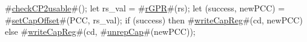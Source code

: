 #\hyperref[sailMIPSzcheckCP2usable]{checkCP2usable}#();
let rs_val = #\hyperref[sailMIPSzrGPR]{rGPR}#(rs);
let (success, newPCC) = #\hyperref[sailMIPSzsetCapOffset]{setCapOffset}#(PCC, rs_val);
if (success) then
  #\hyperref[sailMIPSzwriteCapReg]{writeCapReg}#(cd, newPCC)
else
  #\hyperref[sailMIPSzwriteCapReg]{writeCapReg}#(cd, #\hyperref[sailMIPSzunrepCap]{unrepCap}#(newPCC));
